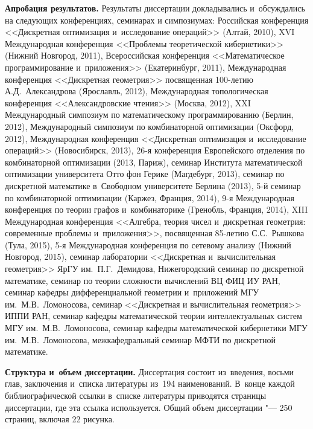
\textbf{Апробация результатов.}
Результаты диссертации докладывались и~обсуждались на следующих конференциях, семинарах и симпозиумах:
Российская конференция <<Дискретная оптимизация и~исследование операций>> (Алтай, 2010), 
XVI Международная конференция <<Проблемы теоретической кибернетики>> (Нижний Новгород, 2011),
Всероссийская конференция <<Математическое программирование и~приложения>> (Екатеринбург, 2011),
Международная конференция <<Дискретная геометрия>> посвященная 100-летию А.Д.~Александрова (Ярославль, 2012),
Международная топологическая конференция <<Александровские чтения>> (Москва, 2012),
XXI Международный симпозиум по математическому программированию (Берлин, 2012),
Международный симпозиум по комбинаторной оптимизации (Оксфорд, 2012),
Международная конференция <<Дискретная оптимизация и~исследование операций>> (Новосибирск, 2013), 
26-я конференция Европейского отделения по комбинаторной оптимизации (2013, Париж),
семинар Института математической оптимизации университета Отто фон Герике (Магдебург, 2013),
семинар по дискретной математике в~Свободном университете Берлина (2013),
5-й семинар по комбинаторной оптимизации (Каржез, Франция, 2014),
9-я Международная конференция по теории графов и~комбинаторике (Гренобль, Франция, 2014),
XIII Международная конференция <<Алгебра, теория чисел и~дискретная геометрия: 
современные проблемы и~приложения>>, посвященная 85-летию С.С.~Рышкова (Тула, 2015),
5-я Международная конференция по сетевому анализу (Нижний Новгород, 2015),
семинар лаборатории <<Дискретная и~вычислительная геометрия>> ЯрГУ им.~П.Г.~Демидова,
Нижегородский семинар по дискретной математике,
семинар по теории сложности вычислений ВЦ ФИЦ ИУ РАН,
семинар кафедры дифференциальной геометрии и~приложений МГУ им.~М.В.~Ломоносова,
семинар <<Дискретная и вычислительная геометрия>> ИППИ РАН, семинар кафедры математической теории интеллектуальных систем МГУ им.~М.В.~Ломоносова, семинар кафедры математической кибернетики МГУ им.~М.В.~Ломоносова, межкафедральный семинар МФТИ по дискретной математике.


\textbf{Структура и~объем диссертации.}
Диссертация состоит из~введения, восьми глав, заключения и~списка литературы из~194 наименований. В~конце каждой библиографической ссылки в~списке литературы приводятся страницы диссертации, где эта ссылка используется.
Общий объем диссертации "--- 250 страниц, включая 22 рисунка. %


